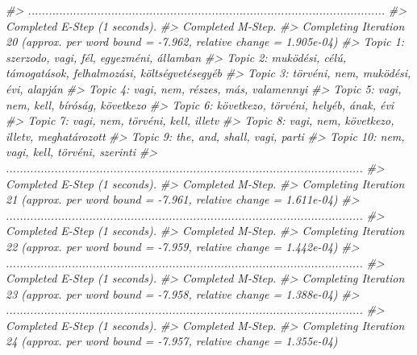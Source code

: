 \documentclass[
]{book}
\newenvironment{Shaded}{\begin{snugshade}}{\end{snugshade}}
\newcommand{\CommentTok}[1]{\textcolor[rgb]{0.56,0.35,0.01}{\textit{#1}}}
\begin{document}
\begin{Shaded}
\begin{Highlighting}[]
\CommentTok{\#\textgreater{} .......................................................................................................}
\CommentTok{\#\textgreater{} Completed E{-}Step (1 seconds). }
\CommentTok{\#\textgreater{} Completed M{-}Step. }
\CommentTok{\#\textgreater{} Completing Iteration 20 (approx. per word bound = {-}7.962, relative change = 1.905e{-}04) }
\CommentTok{\#\textgreater{} Topic 1: szerzodo, vagi, fél, egyezméni, államban }
\CommentTok{\#\textgreater{}  Topic 2: muködési, célú, támogatások, felhalmozási, költségvetésegyéb }
\CommentTok{\#\textgreater{}  Topic 3: törvéni, nem, muködési, évi, alapján }
\CommentTok{\#\textgreater{}  Topic 4: vagi, nem, részes, más, valamennyi }
\CommentTok{\#\textgreater{}  Topic 5: vagi, nem, kell, bíróság, következo }
\CommentTok{\#\textgreater{}  Topic 6: következo, törvéni, helyéb, ának, évi }
\CommentTok{\#\textgreater{}  Topic 7: vagi, nem, törvéni, kell, illetv }
\CommentTok{\#\textgreater{}  Topic 8: vagi, nem, következo, illetv, meghatározott }
\CommentTok{\#\textgreater{}  Topic 9: the, and, shall, vagi, parti }
\CommentTok{\#\textgreater{}  Topic 10: nem, vagi, kell, törvéni, szerinti }
\CommentTok{\#\textgreater{} .......................................................................................................}
\CommentTok{\#\textgreater{} Completed E{-}Step (1 seconds). }
\CommentTok{\#\textgreater{} Completed M{-}Step. }
\CommentTok{\#\textgreater{} Completing Iteration 21 (approx. per word bound = {-}7.961, relative change = 1.611e{-}04) }
\CommentTok{\#\textgreater{} .......................................................................................................}
\CommentTok{\#\textgreater{} Completed E{-}Step (1 seconds). }
\CommentTok{\#\textgreater{} Completed M{-}Step. }
\CommentTok{\#\textgreater{} Completing Iteration 22 (approx. per word bound = {-}7.959, relative change = 1.442e{-}04) }
\CommentTok{\#\textgreater{} .......................................................................................................}
\CommentTok{\#\textgreater{} Completed E{-}Step (1 seconds). }
\CommentTok{\#\textgreater{} Completed M{-}Step. }
\CommentTok{\#\textgreater{} Completing Iteration 23 (approx. per word bound = {-}7.958, relative change = 1.388e{-}04) }
\CommentTok{\#\textgreater{} .......................................................................................................}
\CommentTok{\#\textgreater{} Completed E{-}Step (1 seconds). }
\CommentTok{\#\textgreater{} Completed M{-}Step. }
\CommentTok{\#\textgreater{} Completing Iteration 24 (approx. per word bound = {-}7.957, relative change = 1.355e{-}04) }

\end{Highlighting}
\end{Shaded}
\end{document}
